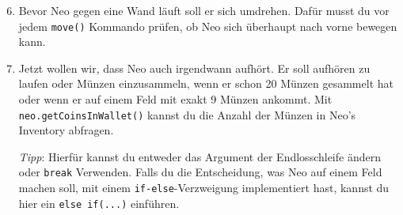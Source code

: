 \begin{enumerate}\setcounter{enumi}{5}
	\item
		Bevor Neo gegen eine Wand läuft soll er sich umdrehen.
		Dafür musst du vor jedem \lstinline{move()} Kommando prüfen, ob Neo sich überhaupt nach vorne bewegen kann.

	\item
		Jetzt wollen wir, dass Neo auch irgendwann aufhört.
		Er soll aufhören zu laufen oder Münzen einzusammeln, wenn er schon 20 Münzen gesammelt hat oder wenn er auf einem Feld mit exakt 9 Münzen ankommt.
		Mit \lstinline{neo.getCoinsInWallet()} kannst du die Anzahl der Münzen in Neo's Inventory abfragen.

		\textit{Tipp}: Hierfür kannst du entweder das Argument der Endlosschleife ändern oder \lstinline{break} Verwenden.
		Falls du die Entscheidung, was Neo auf einem Feld machen soll, mit einem \lstinline{if-else}-Verzweigung implementiert hast, kannst du hier ein \lstinline{else if(...)} einführen.
\end{enumerate}
\newpage
